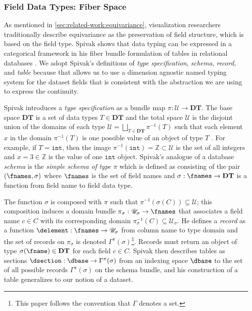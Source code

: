 \documentclass[review]{vgtc}
\theoremstyle{definition}
\theoremstyle{remark}
\begin{document}
\subsubsection{\textcolor{fiber}{Field Data Types: Fiber Space \dfiber}}
\label{sec:atct:fb:fiber}
As mentioned in \autoref{sec:related-work:equivariance}, visualization researchers traditionally describe equivariance as the preservation of field structure, which is based on the field type. Spivak shows that data typing can be expressed in a categorical framework in his fiber bundle formulation of tables in relational databases \cite{spivakDatabasesAreCategories2010,spivakSimplicialDatabases2009}. We adopt Spivak's definitions of \textit{type specification}, \textit{schema}, \textit{record}, and \textit{table} because that allows us to use a dimension agnostic named typing system for the dataset fields that is consistent with the abstraction we are using to express the continuity.

Spivak introduces a \textit{type specification} as a bundle map $\pi: \mathscr{U} \rightarrow \textbf{DT}$. The base space $\textbf{DT}$ is a set of data types $T \in \textbf{DT}$ and the total space $\mathscr{U}$ is the disjoint union of the domains of each type $\mathscr{U} = \bigsqcup_{T \in \textbf{DT}} \pi^{-1}(T)$ such that each element $x$ in the domain $\pi^{-1}(T)$ is one possible value of an object of type $T$ \cite{spivakSimplicialDatabases2009}. For example, if $T=\texttt{int}$, then the image $\pi^{-1}(\texttt{int}) = \mathbb{Z} \subset \mathscr{U}$ is the set of all integers and $x=3 \in \mathbb{Z}$ is the value of one $\texttt{int}$ object. Spivak's analogue of a database \textit{schema}\cite{ullmanFirstCourseDatabase2008} is the \textit{simple schema of type $\pi$} which is defined as consisting of the pair $(\fnames, \sigma)$ where $\fnames$ is the set of field names and $\sigma: \fnames \rightarrow \textbf{DT}$ is a function from field name to field data type\cite{spivakSimplicialDatabases2009}.

The function $\sigma$ is composed with $\pi$ such that $\pi^{-1}(\sigma(C)) \subseteq \mathscr{U}$; this composition induces a domain bundle $\pi_{\sigma}:\mathscr{U}_{\sigma} \rightarrow \fnames$ that associates a field name $c \in C$ with its corresponding domain $\pi^{-1}_{\sigma}(C) \subseteq \mathscr{U}_{\sigma}$. He defines a \textit{record} as a function $\delement: \fnames \rightarrow \mathscr{U}_{\sigma}$ from column name to type domain and the set of records on $\pi_{\sigma}$ is denoted $\Gamma^{\pi}(\sigma)$\footnote{This paper follows the convention that $\Gamma$ denotes a set.}. Records must return an object of type $\sigma(\fname) \in \textbf{DT}$ for each field $c \in C$. Spivak then describes tables as sections $\dsection: \dbase \rightarrow \Gamma^{\pi}(\sigma)$ from an indexing space $\dbase$ to the set of all possible records $\Gamma^{\pi}(\sigma)$ on the schema bundle, and his construction of a table generalizes to our notion of a dataset.
\end{document}
